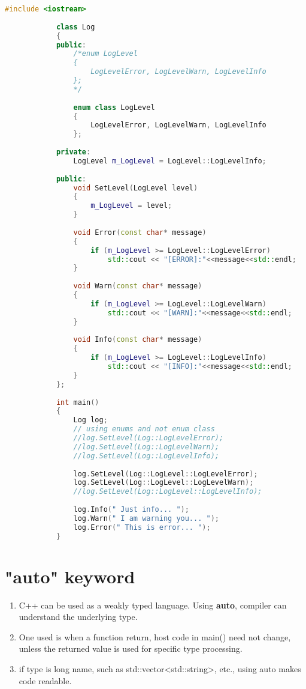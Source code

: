 \documentclass{article}
\begin{document}
        \begin{lstlisting}[language=C++, caption=Enum class example]
            #include <iostream>
            
            class Log
            {
            public:
            	/*enum LogLevel
            	{
            		LogLevelError, LogLevelWarn, LogLevelInfo
            	};
            	*/
            
            	enum class LogLevel
            	{
            		LogLevelError, LogLevelWarn, LogLevelInfo
            	};
            	
            private:
            	LogLevel m_LogLevel = LogLevel::LogLevelInfo;
            	
            public:
            	void SetLevel(LogLevel level)
            	{
            		m_LogLevel = level;
            	}
            	
            	void Error(const char* message)
            	{
            		if (m_LogLevel >= LogLevel::LogLevelError)
            			std::cout << "[ERROR]:"<<message<<std::endl;
            	}
            	
            	void Warn(const char* message)
            	{
            		if (m_LogLevel >= LogLevel::LogLevelWarn)
            			std::cout << "[WARN]:"<<message<<std::endl;
            	}
            
            	void Info(const char* message)
            	{
            		if (m_LogLevel >= LogLevel::LogLevelInfo)
            			std::cout << "[INFO]:"<<message<<std::endl;
            	}
            };
            
            int main()
            {
            	Log log;
            	// using enums and not enum class
            	//log.SetLevel(Log::LogLevelError);
            	//log.SetLevel(Log::LogLevelWarn);
            	//log.SetLevel(Log::LogLevelInfo);
            	
            	log.SetLevel(Log::LogLevel::LogLevelError);
            	log.SetLevel(Log::LogLevel::LogLevelWarn);
            	//log.SetLevel(Log::LogLevel::LogLevelInfo);
            
            	log.Info(" Just info... ");
            	log.Warn(" I am warning you... ");
            	log.Error(" This is error... ");
            }
        \end{lstlisting}

\section{"auto" keyword}
    \begin{enumerate}
        \item C++ can be used as a weakly typed language. Using \textbf{auto}, compiler can understand the underlying type.
        \item One used is when a function return, host code in main() need not change, unless the returned value is used for specific type processing.
        \item if type is long name, such as std::vector<std::string>, etc., using auto makes code readable.
    \end{enumerate} 
    
\end{document}
